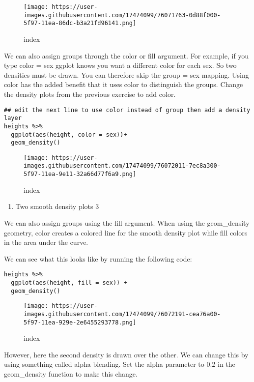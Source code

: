 \documentclass[]{article}
\providecommand{\tightlist}{%
  \setlength{\itemsep}{0pt}\setlength{\parskip}{0pt}}
\begin{document}
\begin{figure}
\centering
\texttt{[image: https://user-images.githubusercontent.com/17474099/76071763-0d88f000-5f97-11ea-86dc-b3a21fd96141.png]}
\caption{index}
\end{figure}

We can also assign groups through the color or fill argument. For
example, if you type color = sex ggplot knows you want a different color
for each sex. So two densities must be drawn. You can therefore skip the
group = sex mapping. Using color has the added benefit that it uses
color to distinguish the groups. Change the density plots from the
previous exercise to add color.

\begin{verbatim}
## edit the next line to use color instead of group then add a density layer
heights %>% 
  ggplot(aes(height, color = sex))+
  geom_density()
\end{verbatim}

\begin{figure}
\centering
\texttt{[image: https://user-images.githubusercontent.com/17474099/76072011-7ec8a300-5f97-11ea-9e11-32a66d77f6a9.png]}
\caption{index}
\end{figure}

\begin{enumerate}
\def\labelenumi{\arabic{enumi}.}
\setcounter{enumi}{21}
\tightlist
\item
  Two smooth density plots 3
\end{enumerate}

We can also assign groups using the fill argument. When using the
geom\_density geometry, color creates a colored line for the smooth
density plot while fill colors in the area under the curve.

We can see what this looks like by running the following code:

\begin{verbatim}
heights %>% 
  ggplot(aes(height, fill = sex)) + 
  geom_density() 
\end{verbatim}

\begin{figure}
\centering
\texttt{[image: https://user-images.githubusercontent.com/17474099/76072191-cea76a00-5f97-11ea-929e-2e6455293778.png]}
\caption{index}
\end{figure}

However, here the second density is drawn over the other. We can change
this by using something called alpha blending. Set the alpha parameter
to 0.2 in the geom\_density function to make this change.
\end{document}
